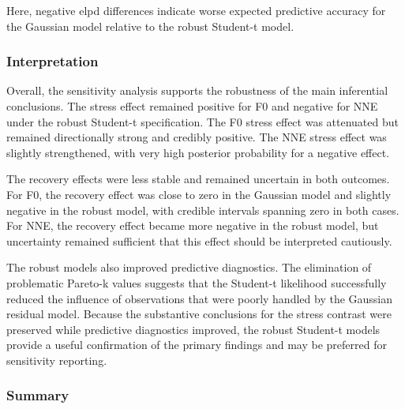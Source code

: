 \documentclass[
  english,
  man,floatsintext]{apa6}
\begin{document}
Here, negative elpd differences indicate worse expected predictive accuracy for the Gaussian model relative to the robust Student-t model.

\subsubsection{Interpretation}\label{interpretation-1}

Overall, the sensitivity analysis supports the robustness of the main inferential conclusions. The stress effect remained positive for F0 and negative for NNE under the robust Student-t specification. The F0 stress effect was attenuated but remained directionally strong and credibly positive. The NNE stress effect was slightly strengthened, with very high posterior probability for a negative effect.

The recovery effects were less stable and remained uncertain in both outcomes. For F0, the recovery effect was close to zero in the Gaussian model and slightly negative in the robust model, with credible intervals spanning zero in both cases. For NNE, the recovery effect became more negative in the robust model, but uncertainty remained sufficient that this effect should be interpreted cautiously.

The robust models also improved predictive diagnostics. The elimination of problematic Pareto-k values suggests that the Student-t likelihood successfully reduced the influence of observations that were poorly handled by the Gaussian residual model. Because the substantive conclusions for the stress contrast were preserved while predictive diagnostics improved, the robust Student-t models provide a useful confirmation of the primary findings and may be preferred for sensitivity reporting.

\subsubsection{Summary}\label{summary}
\end{document}
